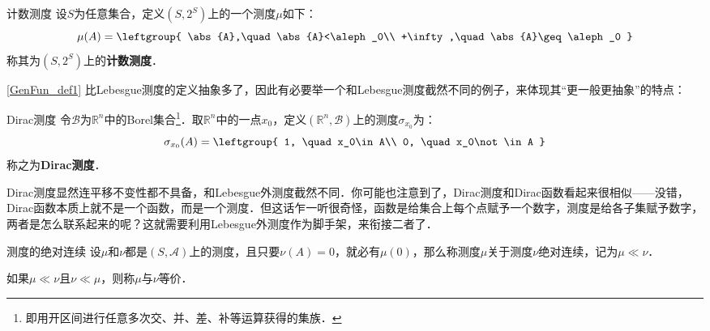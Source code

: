 \begin{example}{计数测度}
设$S$为任意集合，定义$(S, 2^S)$上的一个测度$\mu$如下：
\begin{equation}
\mu(A)=
\leftgroup{
    \abs{A},\quad \abs{A}<\aleph_0\\
    +\infty,\quad \abs{A}\geq\aleph_0
}
\end{equation}
称其为$(S, 2^S)$上的\textbf{计数测度}．
\end{example}

\autoref{GenFun_def1} 比Lebesgue测度的定义抽象多了，因此有必要举一个和Lebesgue测度截然不同的例子，来体现其“更一般更抽象”的特点：

\begin{example}{Dirac测度}
令$\mathcal{B}$为$\mathbb{R}^n$中的Borel集合\footnote{即用开区间进行任意多次交、并、差、补等运算获得的集族．}．取$\mathbb{R}^n$中的一点$x_0$，定义$(\mathbb{R}^n, \mathcal{B})$上的测度$\sigma_{x_0}$为：
\begin{equation}
\sigma_{x_0}(A)=\leftgroup{
    1, \quad x_0\in A\\
    0, \quad x_0\not\in A
}
\end{equation}
称之为\textbf{Dirac测度}．
\end{example}

Dirac测度显然连平移不变性都不具备，和Lebesgue外测度截然不同．你可能也注意到了，Dirac测度和Dirac函数看起来很相似——没错，Dirac函数本质上就不是一个函数，而是一个测度．但这话乍一听很奇怪，函数是给集合上每个点赋予一个数字，测度是给各子集赋予数字，两者是怎么联系起来的呢？这就需要利用Lebesgue外测度作为脚手架，来衔接二者了．

\begin{definition}{测度的绝对连续}
设$\mu$和$\nu$都是$(S, \mathcal{A})$上的测度，且只要$\nu(A)=0$，就必有$\mu(0)$，那么称测度$\mu$关于测度$\nu$绝对连续，记为$\mu\ll\nu$．

如果$\mu\ll\nu$且$\nu\ll\mu$，则称$\mu$与$\nu$等价．
\end{definition}





















